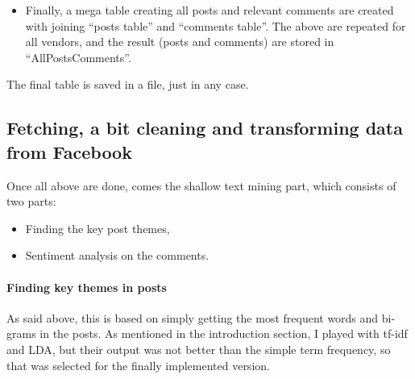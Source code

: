 \documentclass[]{article}
\newenvironment{Shaded}{\begin{snugshade}}{\end{snugshade}}
\newcommand{\KeywordTok}[1]{\textcolor[rgb]{0.13,0.29,0.53}{\textbf{{#1}}}}
\newcommand{\DataTypeTok}[1]{\textcolor[rgb]{0.13,0.29,0.53}{{#1}}}
\newcommand{\StringTok}[1]{\textcolor[rgb]{0.31,0.60,0.02}{{#1}}}
\newcommand{\NormalTok}[1]{{#1}}
\providecommand{\tightlist}{%
  \setlength{\itemsep}{0pt}\setlength{\parskip}{0pt}}
\let\oldparagraph\paragraph
\renewcommand{\paragraph}[1]{\oldparagraph{#1}\mbox{}}
\begin{document}
\begin{itemize}
\tightlist
\item
  Finally, a mega table creating all posts and relevant comments are
  created with joining ``posts table'' and ``comments table''. The above
  are repeated for all vendors, and the result (posts and comments) are
  stored in ``AllPostsComments''.
\end{itemize}

\begin{Shaded}
\end{Shaded}

The final table is saved in a file, just in any case.

\subsection{Fetching, a bit cleaning and transforming data from
Facebook}\label{fetching-a-bit-cleaning-and-transforming-data-from-facebook-1}

Once all above are done, comes the shallow text mining part, which
consists of two parts:

\begin{itemize}
\tightlist
\item
  Finding the key post themes,
\item
  Sentiment analysis on the comments.
\end{itemize}

\paragraph{Finding key themes in
posts}\label{finding-key-themes-in-posts}

As said above, this is based on simply getting the most frequent words
and bi-grams in the posts. As mentioned in the introduction section, I
played with tf-idf and LDA, but their output was not better than the
simple term frequency, so that was selected for the finally implemented
version.
\end{document}
